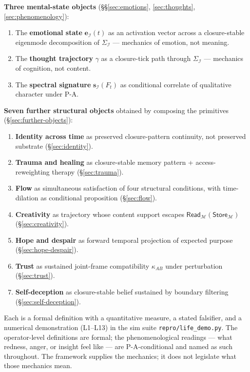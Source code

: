\documentclass[11pt]{article}
\theoremstyle{plain}
\theoremstyle{definition}
\theoremstyle{remark}
\newcommand{\Ical}{\mathcal{I}}
\newcommand{\Mcal}{\mathcal{M}}
\begin{document}
\textbf{Three mental-state objects} (\S\S\ref{sec:emotions}, \ref{sec:thoughts}, \ref{sec:phenomenology}):
\begin{enumerate}[leftmargin=2em, start=9]
\item The \textbf{emotional state} $\mathbf{e}_\Ical(t)$ as an activation vector across a closure-stable eigenmode decomposition of $\Sigma_\Ical$ --- mechanics of emotion, not meaning.
\item The \textbf{thought trajectory} $\gamma$ as a closure-tick path through $\Sigma_\Ical$ --- mechanics of cognition, not content.
\item The \textbf{spectral signature} $\mathbf{s}_\Ical(F_t)$ as conditional correlate of qualitative character under P-A.
\end{enumerate}

\textbf{Seven further structural objects} obtained by composing the primitives (\S\ref{sec:further-objects}):
\begin{enumerate}[leftmargin=2em, start=12]
\item \textbf{Identity across time} as preserved closure-pattern continuity, not preserved substrate (\S\ref{sec:identity}).
\item \textbf{Trauma and healing} as closure-stable memory pattern + access-reweighting therapy (\S\ref{sec:trauma}).
\item \textbf{Flow} as simultaneous satisfaction of four structural conditions, with time-dilation as conditional proposition (\S\ref{sec:flow}).
\item \textbf{Creativity} as trajectory whose content support escapes $\mathsf{Read}_\Mcal(\mathsf{Store}_\Mcal)$ (\S\ref{sec:creativity}).
\item \textbf{Hope and despair} as forward temporal projection of expected purpose (\S\ref{sec:hope-despair}).
\item \textbf{Trust} as sustained joint-frame compatibility $\kappa_{AB}$ under perturbation (\S\ref{sec:trust}).
\item \textbf{Self-deception} as closure-stable belief sustained by boundary filtering (\S\ref{sec:self-deception}).
\end{enumerate}

Each is a formal definition with a quantitative measure, a stated falsifier, and a numerical demonstration (L1--L13) in the sim suite \texttt{repro/life\_demo.py}. The operator-level definitions are formal; the phenomenological readings --- what redness, anger, or insight feel like --- are P-A-conditional and named as such throughout. The framework supplies the mechanics; it does not legislate what those mechanics mean.
\end{document}
